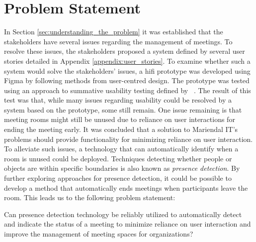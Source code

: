 \section{Problem Statement}\label{sec:problem_statement}
In Section \ref{sec:understanding_the_problem} it was established that the stakeholders have several issues regarding the management of meetings. 
To resolve these issues, the stakeholders proposed a system defined by several user stories detailed in Appendix \ref{appendix:user_stories}. 
To examine whether such a system would solve the stakeholders' issues, a hifi prototype was developed using Figma\cite{Figma} by following methods from user-centred design.
The prototype was tested using an approach to summative usability testing defined by \citeauthor{lazar2005web}~\cite{lazar2005web}. 
The result of this test was that, while many issues regarding usability could be resolved by a system based on the prototype, some still remain. 
One issue remaining is that meeting rooms might still be unused due to reliance on user interactions for ending the meeting early.
It was concluded that a solution to Mariendal IT's problems should provide functionality for minimizing reliance on user interaction.
To alleviate such issues, a technology that can automatically identify when a room is unused could be deployed. 
Techniques detecting whether people or objects are within specific boundaries is also known as \textit{presence detection}.
By further exploring approaches for presence detection, it could be possible to develop a method that automatically ends meetings when participants leave the room.
This leads us to the following problem statement:
\begin{problem_statement}
    Can presence detection technology be reliably utilized to automatically detect and indicate the status of a meeting to minimize reliance on user interaction and improve the management of meeting spaces for organizations? 
\end{problem_statement}

